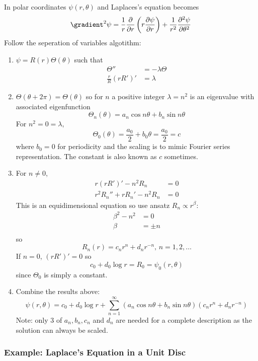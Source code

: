 \documentclass[a4paper]{article}
\newcommand*{\grad}{\gradient}
\newcommand*{\laplace}{\grad^2}
\newcommand*{\lap}{\laplace}
\begin{document}
In polar coordinates \(\psi(r, \theta)\) and Laplaces's equation becomes
\[
  \lap \psi = \frac{1}{r} \frac{\partial  }{\partial r}\left(r \frac{\partial \psi}{\partial r} \right) + \frac{1}{r^2} \frac{\partial^2 \psi}{\partial \theta^2}
\]
Follow the seperation of variables algotithm:
\begin{enumerate}
\item \(\psi = R(r) \Theta(\theta)\) such that
  \begin{align*}
    \Theta'' &= -\lambda \Theta \\
    \frac{r}{R}(rR')' &= \lambda
  \end{align*}
\item \(\Theta(\theta + 2\pi) = \Theta(\theta)\) so for \(n \) a positive integer \(\lambda = n^2\) is an eigenvalue with associated eigenfunction
  \[
    \Theta_n(\theta) = a_n \cos n\theta + b_n \sin n\theta
  \]
  For \(n^2 = 0 = \lambda\),
  \[
    \Theta_0(\theta) = \frac{a_0}{2} + b_0 \theta = \frac{a_0}{2} = c
  \]
  where \(b_0 = 0\) for periodicity and the scaling is to mimic Fourier series representation. The constant is also known as \(c\) sometimes.

\item For \(n \neq 0\),
  \begin{align*}
    r(rR')' - n^2 R_n &= 0 \\
    r^2R_n'' + rR_n' - n^2R_n &= 0 
  \end{align*}
  This is an equidimensional equation so use ansatz \(R_n \propto r^\beta\):
  \begin{align*}
    \beta^2 - n^2 &= 0 \\
    \beta &= \pm n \\
  \end{align*}
  so
  \[
    R_n(r) = c_n r^n + d_n r^{-n}, \, n = 1, 2, \dots
  \]
  If \(n = 0\), \((rR')' = 0\) so
  \[
    c_0 + d_0 \log r = R_0 = \psi_0(r, \theta)
  \]
  since \(\Theta_0\) is simply a constant.
\item Combine the results above:
  \[
    \psi(r, \theta) = c_0 + d_0 \log r + \sum_{n = 1}^{\infty} \left( a_n \cos n\theta + b_n \sin n\theta \right) \left( c_n r^n + d_n r^{-n} \right)
  \]
  Note: only \(3\) of \(a_n, b_n, c_n \) and \(d_n\) are needed for a complete description as the solution can always be scaled.
\end{enumerate}

\subsubsection{Example: Laplace's Equation in a Unit Disc}
\end{document}
